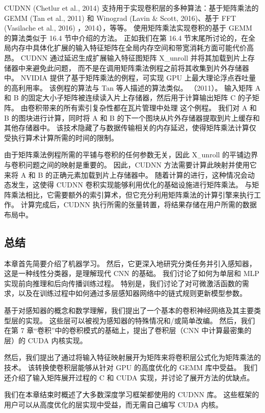 CUDNN (Chetlur et al., 2014) 支持用于实现卷积层的多种算法：基于矩阵乘法的 GEMM (Tan et al., 2011) 
和 Winograd (Lavin \& Scott, 2016)、基于 FFT (Vasilache et al., 2016) ，2014），等等。 
使用矩阵乘法实现卷积的基于 GEMM 的算法类似于 16.4 节中介绍的方法。 
正如我们在第 16.4 节末尾所讨论的，在全局内存中具体化扩展的输入特征矩阵在全局内存空间和带宽消耗方面可能代价高昂。 
CUDNN 通过延迟生成扩展输入特征图矩阵 X\_unroll 并将其加载到片上存储器中来避免此问题，
而不是在调用矩阵乘法例程之前将其收集到片外存储器中。 
NVIDIA 提供了基于矩阵乘法的例程，可实现 GPU 上最大理论浮点吞吐量的高利用率。 
该例程的算法与 Tan 等人描述的算法类似。 （2011）。 
输入矩阵 A 和 B 的固定大小子矩阵被连续读入片上存储器，然后用于计算输出矩阵 C 的子矩阵。
由卷积带来的所有索引复杂性都在瓦片管理中处理 这个例程。 
我们对 A 和 B 的图块进行计算，同时将 A 和 B 的下一个图块从片外存储器提取到片上缓存和其他存储器中。 
该技术隐藏了与数据传输相关的内存延迟，使得矩阵乘法计算仅受执行算术计算所需的时间的限制。


由于矩阵乘法例程所需的平铺与卷积的任何参数无关，因此 $\mathrm{X}_{-}$unroll 的平铺边界与卷积问题之间的映射是重要的。 
因此，CUDNN 方法需要计算此映射并使用它来将 A 和 B 的正确元素加载到片上存储器中。 
随着计算的进行，这种情况会动态发生，这使得 CUDNN 卷积实现能够利用优化的基础设施进行矩阵乘法。 
与矩阵乘法相比，它需要额外的索引算术，但它充分利用矩阵乘法的计算引擎来执行工作。 
计算完成后，CUDNN 执行所需的张量转置，将结果存储在用户所需的数据布局中。

\subsection{总结}
本章首先简要介绍了机器学习。 然后，它更深入地研究分类任务并引入感知器，这是一种线性分类器，是理解现代 CNN 的基础。 
我们讨论了如何为单层和 MLP 实现前向推理和后向传播训练过程。 
特别是，我们讨论了对可微激活函数的需求，以及在训练过程中如何通过多层感知器网络中的链式规则更新模型参数。

基于对感知器的概念和数学理解，我们提出了一个基本的卷积神经网络及其主要类型层的实现。 
这些层可以被视为感知器的特殊情况和/或简单改编。 
然后，我们在第 7 章“卷积”中的卷积模式的基础上，提出了卷积层（CNN 中计算最密集的层）的 CUDA 内核实现。

然后，我们提出了通过将输入特征映射展开为矩阵来将卷积层公式化为矩阵乘法的技术。 
该转换使卷积层能够从针对 GPU 的高度优化的 GEMM 库中受益。 
我们还介绍了输入矩阵展开过程的 C 和 CUDA 实现，并讨论了展开方法的优缺点。

我们在本章结束时概述了大多数深度学习框架都使用的 CUDNN 库。 
这些框架的用户可以从高度优化的层实现中受益，而无需自己编写 CUDA 内核。